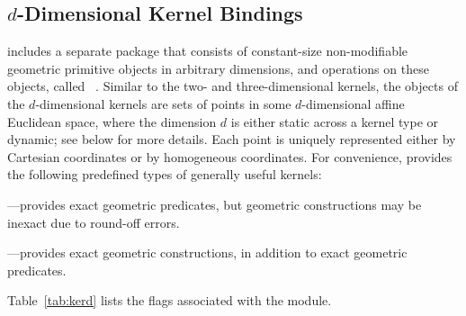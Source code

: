 \subsection{$d$-Dimensional Kernel Bindings}
\label{ssec:modules:kerneld}
\cgal{} includes a separate package that consists of constant-size non-modifiable geometric primitive objects in arbitrary dimensions, and operations on these objects, called \dDGeometryKernelPackage{}~\cite{cgal:s-gkd-21a}. Similar to the two- and three-dimensional kernels, the objects of the $d$-dimensional kernels are sets of points in some $d$-dimensional affine Euclidean space, where the dimension $d$ is either static across a kernel type or dynamic; see below for more details. Each point is uniquely represented either by Cartesian coordinates or by homogeneous coordinates. For convenience, \cgal{} provides the following predefined types of generally useful kernels:
\begin{compactenum}
\item {}---provides exact geometric
  predicates, but geometric constructions may be inexact due to
  round-off errors.
\item {}---provides exact geometric
  constructions, in addition to exact geometric predicates.
\end{compactenum}
Table~\ref{tab:kerd} lists the \cmake{} flags associated with the \dDGeometryKernelPackage{} module.

\begin{table}[!htp]
  \caption{\dDGeometryKernelPackage{} module flags}
  \centering{}
 \label{tab:kerd}
\end{table}

